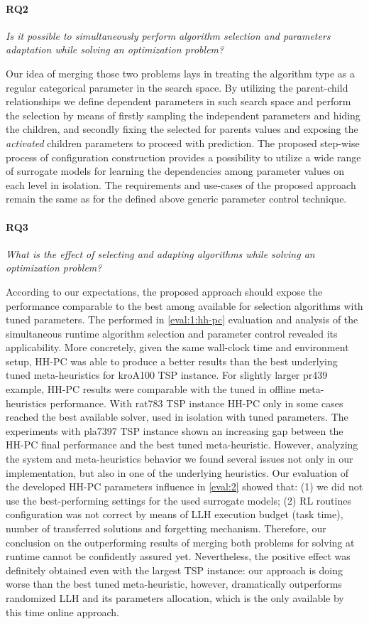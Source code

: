 \paragraph{RQ2} \emph{Is it possible to simultaneously perform algorithm selection and parameters adaptation while solving an optimization problem?}
	
Our idea of merging those two problems lays in treating the algorithm type as a regular categorical parameter in the search space. By utilizing the parent-child relationships we define dependent parameters in such search space and perform the selection by means of firstly sampling the independent parameters and hiding the children, and secondly fixing the selected for parents values and exposing the \emph{activated} children parameters to proceed with prediction. The proposed step-wise process  of configuration construction provides a possibility to utilize a wide range of surrogate models for learning the dependencies among parameter values on each level in isolation. The requirements and use-cases of the proposed approach remain the same as for the defined above generic parameter control technique.
	
\paragraph{RQ3} \emph{What is the effect of selecting and adapting algorithms while solving an optimization problem?}

According to our expectations, the proposed approach should expose the performance comparable to the best among available for selection algorithms with tuned parameters. The performed in \cref{eval:1:hh-pc} evaluation and analysis of the simultaneous runtime algorithm selection and parameter control revealed its applicability. More concretely, given the same wall-clock time and environment setup, HH-PC was able to produce a better results than the best underlying tuned meta-heuristics for kroA100 TSP instance. For slightly larger pr439 example, HH-PC results were comparable with the tuned in offline meta-heuristics performance. With rat783 TSP instance HH-PC only in some cases reached the best available solver, used in isolation with tuned parameters. The experiments with pla7397 TSP instance shown an increasing gap between the HH-PC final performance and the best tuned meta-heuristic. However, analyzing the system and meta-heuristics behavior we found several issues not only in our implementation, but also in one of the underlying heuristics. Our evaluation of the developed HH-PC parameters influence in \cref{eval:2} showed that: (1) we did not use the best-performing settings for the used surrogate models; (2) RL routines configuration was not correct by means of LLH execution budget (task time), number of transferred solutions and forgetting mechanism. Therefore, our conclusion on the outperforming results of merging both problems for solving at runtime cannot be confidently assured yet. Nevertheless, the positive effect was definitely obtained even with the largest TSP instance: our approach is doing worse than the best tuned meta-heuristic, however, dramatically outperforms randomized LLH and its parameters allocation, which is the only available by this time online approach.

